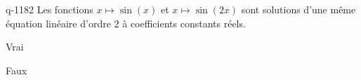 \begin{truefalse}{q-1182}
Les fonctions $x\mapsto \sin(x)$ et $x\mapsto \sin(2x)$ sont solutions d'une même équation linéaire d'ordre $2$ à coefficients constants réels.
\item Vrai
\item* Faux
\end{truefalse}

